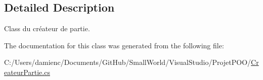 \subsection{Detailed Description}
Class du créateur de partie. 

The documentation for this class was generated from the following file\-:\begin{DoxyCompactItemize}
\item 
C\-:/\-Users/damienc/\-Documents/\-Git\-Hub/\-Small\-World/\-Visual\-Studio/\-Projet\-P\-O\-O/\hyperlink{_createur_partie_8cs}{Createur\-Partie.\-cs}\end{DoxyCompactItemize}

